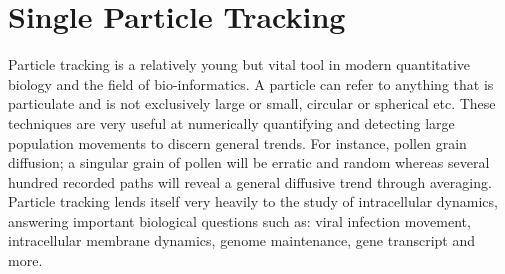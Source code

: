 
\section{Single Particle Tracking}



Particle tracking is a relatively young but vital tool in modern quantitative biology and the field of bio-informatics.
A particle can refer to anything that is particulate and is not exclusively large or small, circular or spherical etc.
These techniques are very useful at numerically quantifying and detecting large population movements to discern general trends.
For instance, pollen grain diffusion; a singular grain of pollen will be erratic and random whereas several hundred recorded paths will reveal a general diffusive trend through averaging.
Particle tracking lends itself very heavily to the study of intracellular dynamics, answering important biological questions such as: viral infection movement\cite{Brandenburg2007}, intracellular membrane dynamics\cite{Chenouard2014}, genome maintenance, gene transcript\cite{Planchon2011} and more\cite{Cognet2014}.

